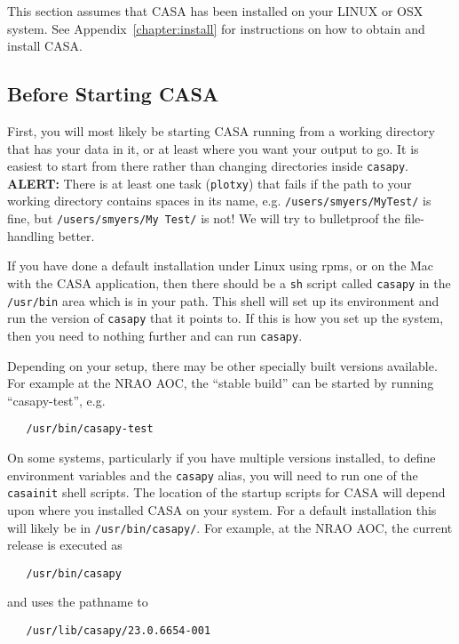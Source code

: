 This section assumes that CASA has been installed on your LINUX or OSX
system.  See Appendix~\ref{chapter:install} for instructions on how to 
obtain and install CASA.  

\subsection{Before Starting CASA}
\label{section:intro.basics.before}

First, you will most likely be starting CASA running from a working
directory that has your data in it, or at least where you want your
output to go.  It is easiest to start from there rather than changing
directories inside {\tt casapy}.
{\bf ALERT:} There is at least one task ({\tt plotxy}) that 
fails if the path to your working directory contains spaces in
its name, e.g. {\tt /users/smyers/MyTest/} is fine, but 
{\tt /users/smyers/My\ Test/} is not!  We will try to bulletproof the
file-handling better.

If you have done a default installation under Linux using rpms, or 
on the Mac with the CASA application, then there should be a {\tt sh}
script called {\tt casapy} in the {\tt /usr/bin} area which is in
your path.  This shell will set up its environment and run the version
of {\tt casapy} that it points to.  If this is how you set up the
system, then you need to nothing further and can run {\tt casapy}.

Depending on your setup, there may be other specially built versions
available. For example at the NRAO AOC, the ``stable build'' can be
started by running ``casapy-test'', e.g.
\small
\begin{verbatim}
   /usr/bin/casapy-test
\end{verbatim}
\normalsize

On some systems, particularly if you have multiple versions installed,
to define environment variables and the {\tt casapy} alias, you will
need to run one of the {\tt casainit} shell scripts.
The location of the startup scripts for CASA will depend upon where
you installed CASA on your system.  For a default installation
this will likely be in {\tt /usr/bin/casapy/}.  
For example, at the NRAO AOC, the current release is executed as
\small
\begin{verbatim}
   /usr/bin/casapy
\end{verbatim}
\normalsize
and uses the pathname to
\small
\begin{verbatim}
   /usr/lib/casapy/23.0.6654-001
\end{verbatim}
\normalsize

